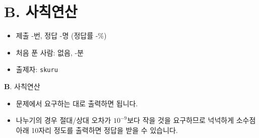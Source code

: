 \section{B. 사칙연산}

\begin{frame} %
    \begin{itemize}
        \item 제출 -번, 정답 -명 (정답률 -\%)
        \item 처음 푼 사람: 없음, -분
        \item 출제자: \texttt{skuru}
    \end{itemize}
\end{frame}

\begin{frame}{\textbf{B}. 사칙연산}
    \begin{itemize}
        \item 문제에서 요구하는 대로 출력하면 됩니다.
        \item 나누기의 경우 절대/상대 오차가 $10^{-9}$보다 작을 것을 요구하므로 넉넉하게 소수점 아래 10자리 정도를 출력하면 정답을 받을 수 있습니다.
    \end{itemize}
\end{frame}
